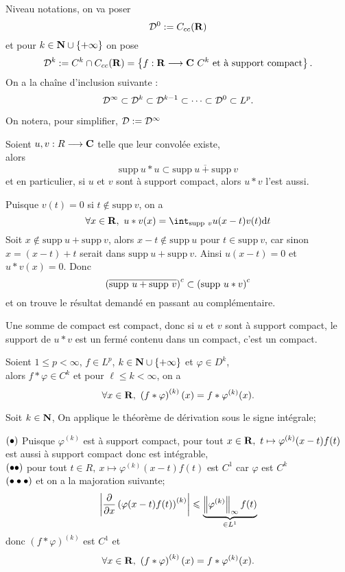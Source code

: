 \documentclass[a4paper,11pt, twoside]{article}
\begin{document}
Niveau notations, on va poser
$$\mathcal D^0:=C_{cc}(\mathbf R)$$
et pour $k\in \mathbf N\cup\left\{+\infty\right\}$ on pose 
$$\mathcal D^k:=C^k\cap C_{cc}(\mathbf R)=\left\{f:\mathbf R\longrightarrow\mathbf C\ C^k\text{ et à support compact}\right\}.$$
On a la chaîne d'inclusion suivante : 
$$\mathcal D^\infty\subset \mathcal D^k\subset \mathcal D^{k-1}\subset\cdots\subset \mathcal D^0\subset L^p.$$

On notera, pour simplifier, $\mathcal D:=\mathcal D^{\infty}$


\begin{prop}
  Soient $u,v:R\longrightarrow\mathbf C$ telle que leur convolée existe,\\

  alors 
  $$\mathrm{supp}\ u*u\subset\overline{\mathrm{supp}\ u+\mathrm{supp}\ v}$$
  et en particulier, si $u$ et $v$ sont à support compact, alors $u*v$ l'est aussi.
\end{prop}


\begin{Proof}
  Puisque $v(t)=0$ si $t\notin\mathrm{supp}\ v$, on a 
  $$\forall x\in\R,\ u*v(x)=\int_{\mathrm{supp}\ v}u(x-t)v(t)\dt$$
  Soit $x\notin \mathrm{supp}\ u+\mathrm{supp}\ v$, alors $x-t\notin\mathrm{supp}\ u$ pour $t\in\mathrm{supp}\ v$, car sinon $x=(x-t)+t$ serait dans $\mathrm{supp}\ u+\mathrm{supp}\ v$. Ainsi $u(x-t)=0$ et $u*v(x)=0$. Donc 
  $$\Par{\overline{\mathrm{supp}\ u+\mathrm{supp}\ v}}^c\subset \Par{\mathrm{supp}\ u*v}^c$$
  et on trouve le résultat demandé en passant au complémentaire.

  Une somme de compact est compact, donc si $u$ et $v$ sont à support compact, le support de $u*v$ est un fermé contenu dans un compact, c'est un compact.
\end{Proof}
\begin{prop}
  Soient $1\leqslant p<\infty$, $f\in L^p$, $k\in\mathbf N\cup\left\{+\infty\right\}$ et $\varphi\in D^k$,\\

  alors $f*\varphi\in C^k$ et pour $\ell\leqslant k<\infty$, on a 
  $$\forall x\in\R,\ \Par{f*\varphi}^{(k)}(x)=f*\varphi^{(k)}(x).$$
\end{prop}


\begin{Proof}
  Soit $k\in \mathbf N$, On applique le théorème de dérivation sous le signe intégrale;
  
  $(\bullet)$ Puisque $\varphi^{(k)}$ est à support compact, pour tout $x\in\R,\ t\mapsto\varphi^{(k)}(x-t)f(t)$ est aussi à support compact donc est intégrable,\\
  $(\bullet\bullet)$ pour tout $t\in R,\ x\mapsto \varphi^{(k)}(x-t)f(t)$ est $C^1$ car $\varphi$ est $C^k$\\
  $(\bullet\bullet\bullet)$ et on a la majoration suivante;
  $$\left| \frac{\partial}{\partial x}\left(\varphi(x-t)f(t)\right)^{(k)}\right|\leqslant \underbrace{\left\lVert\varphi^{(k)}\right\rVert_{\infty}f(t)}_{\in L^1}$$
  donc $(f*\varphi)^{(k)}$ est $C^1$ et 
  $$\forall x\in\R,\ \Par{f*\varphi}^{(k)}(x)=f*\varphi^{(k)}(x).$$
\end{Proof}
\end{document}
